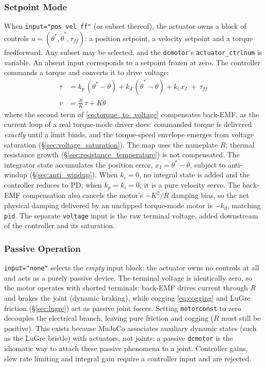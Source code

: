 \documentclass[10pt, a4paper, twocolumn]{article}
\let\oldtexttt\texttt
\renewcommand{\texttt}[1]{{\smaller\oldtexttt{#1}}}
\begin{document}
\subsubsection{Setpoint Mode}
\label{sec:setpoint_mode}

When \texttt{input="pos vel ff"} (or subset thereof), the actuator owns a
block of controls $u = (\theta^*, \dot\theta^*, \tau_{f\!f})$: a position setpoint, a velocity
setpoint and a torque feedforward. Any subset may be selected, and the \texttt{dcmotor}'s \texttt{actuator\_ctrlnum} is variable.
An absent input corresponds to a setpoint frozen at
zero. The controller commands a torque and converts it to drive voltage:
\begin{align}
  \tau &= k_p \, (\theta^* - \theta) + k_d \, (\dot\theta^* - \dot\theta)
      + k_i \, x_I \; + \, \tau_{f\!f}
  \label{eq:setpoint_mode} \\
  v &= \frac{R}{K} \, \tau + K \dot\theta
  \label{eq:torque_to_voltage}
\end{align}
where the second term of \eqref{eq:torque_to_voltage} compensates back-EMF, as the
current loop of a real torque-mode driver does: commanded torque is delivered {\em
exactly} until a limit binds, and the torque-speed envelope emerges from voltage
saturation (\S\ref{sec:voltage_saturation}). The map uses the nameplate $R$; thermal
resistance growth (\S\ref{sec:resistance_temperature}) is not compensated. The
integrator state accumulates the position error, $\dot x_I = \theta^* - \theta$,
subject to anti-windup (\S\ref{sec:anti_windup}). When $k_i = 0$, no integral state
is added and the controller reduces to PD; when $k_p = k_i = 0$, it is a pure
velocity servo. The back-EMF compensation also cancels the motor's $-K^2/R$ damping
bias, so the net physical damping delivered by an unclipped torque-mode motor is
$-k_d$, matching \texttt{pid}. The separate \texttt{voltage} input is the raw
terminal voltage, added downstream of the controller and its saturation.

\subsubsection{Passive Operation}
\label{sec:passive}

\texttt{input="none"} selects the {\em empty} input block: the actuator owns no
controls at all and acts as a purely passive device. The terminal voltage is
identically zero, so the motor operates with shorted terminals: back-EMF drives
current through $R$ and brakes the joint (dynamic braking), while cogging
\eqref{eq:cogging} and LuGre friction (\S\ref{sec:lugre}) act as passive joint
forces. Setting \texttt{motorconst} to zero decouples the electrical branch,
leaving pure friction and cogging ($R$ must still be positive). This exists
because MuJoCo associates auxiliary
dynamic states (such as the LuGre bristle) with actuators, not joints: a passive
\texttt{dcmotor} is the idiomatic way to attach these passive phenomena to a joint.
Controller gains, slew rate limiting and integral gain require a controller input and are rejected.
\end{document}
